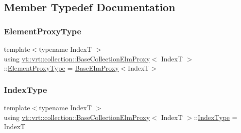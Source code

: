 \subsection{Member Typedef Documentation}
\mbox{\label{structvt_1_1vrt_1_1collection_1_1_base_collection_elm_proxy_aeb2058caef8c935a8a88654787672305}} 
\subsubsection{\texorpdfstring{Element\+Proxy\+Type}{ElementProxyType}}
{\footnotesize\ttfamily template$<$typename IndexT $>$ \\
using \hyperlink{structvt_1_1vrt_1_1collection_1_1_base_collection_elm_proxy}{vt\+::vrt\+::collection\+::\+Base\+Collection\+Elm\+Proxy}$<$ IndexT $>$\+::\hyperlink{structvt_1_1vrt_1_1collection_1_1_base_collection_elm_proxy_aeb2058caef8c935a8a88654787672305}{Element\+Proxy\+Type} =  \hyperlink{structvt_1_1vrt_1_1collection_1_1_base_elm_proxy}{Base\+Elm\+Proxy}$<$IndexT$>$}

\mbox{\label{structvt_1_1vrt_1_1collection_1_1_base_collection_elm_proxy_af599b7a386e6cb65156cd57917ef8b07}} 
\subsubsection{\texorpdfstring{Index\+Type}{IndexType}}
{\footnotesize\ttfamily template$<$typename IndexT $>$ \\
using \hyperlink{structvt_1_1vrt_1_1collection_1_1_base_collection_elm_proxy}{vt\+::vrt\+::collection\+::\+Base\+Collection\+Elm\+Proxy}$<$ IndexT $>$\+::\hyperlink{structvt_1_1vrt_1_1collection_1_1_base_collection_elm_proxy_af599b7a386e6cb65156cd57917ef8b07}{Index\+Type} =  IndexT}

